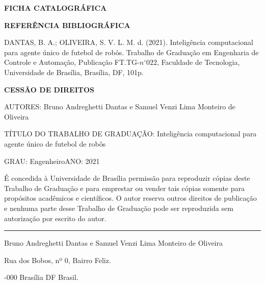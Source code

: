 \noindent \textbf{FICHA CATALOGRÁFICA}

\noindent %

\noindent \medskip{}


\noindent \textbf{REFERÊNCIA BIBLIOGRÁFICA}

DANTAS, B. A.; OLIVEIRA, S. V. L. M. d. (2021). Inteligência computacional para agente único de futebol de robôs. Trabalho de Graduação
em Engenharia de Controle e Automação, Publicação FT.TG-$n^{\circ}022$,
Faculdade de Tecnologia, Universidade de Brasília, Brasília, DF, 101p.

\noindent \bigskip{}


\noindent \textbf{CESSÃO DE DIREITOS}

\noindent AUTORES: Bruno Andreghetti Dantas e Samuel Venzi Lima Monteiro de Oliveira

TÍTULO DO TRABALHO DE GRADUAÇÃO: Inteligência computacional para agente único de futebol de robôs

\noindent \medskip{}


\noindent GRAU: Engenheiro\hfill{}ANO: 2021\hfill{}

\noindent \medskip{}


É concedida à Universidade de Brasília permissão para reproduzir cópias
deste Trabalho de Graduação e para emprestar ou vender tais cópias
somente para propósitos acadêmicos e científicos. O autor reserva
outros direitos de publicação e nenhuma parte desse Trabalho de Graduação
pode ser reproduzida sem autorização por escrito do autor.

\noindent \bigskip{}


\noindent \rule[0.5ex]{1\columnwidth}{1pt}

\noindent Bruno Andreghetti Dantas e Samuel Venzi Lima Monteiro de Oliveira

\noindent Rua dos Bobos, nº 0, Bairro Feliz.

-000 Brasília \textendash{} DF \textendash{} Brasil.
